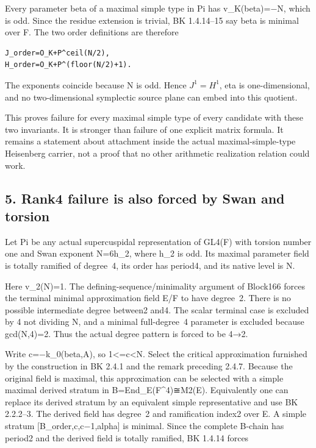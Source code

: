 Every parameter beta of a maximal simple type in Pi has v\_K(beta)=−N,
which is odd. Since the residue extension is trivial, BK 1.4.14--15 say
beta is minimal over F. The two order definitions are therefore

\begin{Verbatim}[fontsize=\small,breaklines=true,breakanywhere=true]
J_order=O_K+P^ceil(N/2),
H_order=O_K+P^(floor(N/2)+1).
\end{Verbatim}

The exponents coincide because N is odd. Hence \(J^1=H^1\),
eta is one-dimensional, and no two-dimensional symplectic source plane
can embed into this quotient.

This proves failure for every maximal simple type of every candidate
with these two invariants. It is stronger than failure of one explicit
matrix formula. It remains a statement about attachment inside the
actual maximal-simple-type Heisenberg carrier, not a proof that no other
arithmetic realization relation could work.

\hypertarget{dyadic_capacity-rank~4-failure-is-also-forced-by-swan-and-torsion}{%
\subsection{5. Rank4 failure is also forced by Swan and
torsion}\label{dyadic_capacity-rank~4-failure-is-also-forced-by-swan-and-torsion}}

Let Pi be any actual supercuspidal representation of GL4(F) with torsion
number one and Swan exponent N=6h\_2, where h\_2 is odd. Its maximal
parameter field is totally ramified of degree~4, its order has period4,
and its native level is N.

Here v\_2(N)=1. The defining-sequence/minimality argument of Block166
forces the terminal minimal approximation field E/F to have degree~2.
There is no possible intermediate degree between2 and4. The scalar
terminal case is excluded by 4 not dividing N, and a minimal
full-degree~4 parameter is excluded because gcd(N,4)=2. Thus the actual
degree pattern is forced to be 4→2.

Write c=−k\_0(beta,A), so 1\textless=c\textless N. Select the critical
approximation furnished by the construction in BK 2.4.1 and the remark
preceding 2.4.7. Because the original field is maximal, this
approximation can be selected with a simple maximal derived stratum in
B=End\_E(F\^{}4)≅M2(E). Equivalently one can replace its derived stratum
by an equivalent simple representative and use BK 2.2.2--3. The derived
field has degree~2 and ramification index2 over E. A simple stratum
{[}B\_order,c,c−1,alpha{]} is minimal. Since the complete B-chain has
period2 and the derived field is totally ramified, BK 1.4.14 forces

